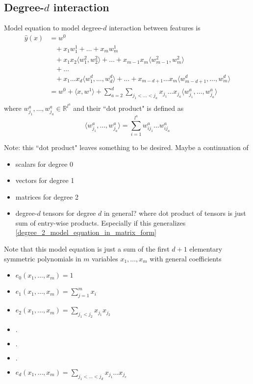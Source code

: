 \documentclass[14pt, reqno]{amsart}
\theoremstyle{definition}
\begin{document}
\vfill
\pagebreak

\subsection{Degree-$d$ interaction} Model equation to model degree-$d$ interaction between features is
\begin{equation}\label{degree_d_model_equation}
\begin{split}
\hat{y}(x) & = w^0 \\
 & \,\,\,\,\, + x_1 w_1^1 + \dots + x_m w_m^1 \\
 & \,\,\,\,\, + x_1 x_2 \langle w_1^2, w_2^2 \rangle + \dots + x_{m-1} x_m \langle w_{m-1}^2, w_m^2 \rangle \\
 & \,\,\,\,\, + \dots \\
 & \,\,\,\,\, + x_1 \dots x_d \langle w_1^d, \dots , w_d^d \rangle + \dots + x_{m-d+1} \dots x_m \langle w_{m-d+1}^d, \dots , w_m^d \rangle \\
 & = w^0 + \langle x, w^1 \rangle + \sum\limits_{a = 2}^d \sum\limits_{j_1 < ... < j_a} x_{j_1} ... x_{j_a} \langle w_{j_1}^a, \dots , w_{j_a}^a \rangle \\
\end{split}
\end{equation}
where $w_{j_1}^a, \dots , w_{j_a}^a \in \mathbb{R}^{l^a}$ and their ``dot product" is defined as
$$\langle w_{j_1}^a, \dots , w_{j_a}^a \rangle = \sum\limits_{i = 1}^{l^a} w_{i j_1}^a \dots w_{i j_a}^a$$

Note: this ``dot product" leaves something to be desired. Maybe a continuation of
\begin{itemize}
\item scalars for degree 0
\item vectors for degree 1
\item matrices for degree 2
\item degree-$d$ tensors for degree $d$ in general? where dot product of tensors is just sum of entry-wise products. Especially if this generalizes \eqref{degree_2_model_equation_in_matrix_form}
\end{itemize}

Note that this model equation is just a sum of the first $d+1$ elementary symmetric polynomials in $m$ variables $x_1, \dots , x_m$ with general coefficients
\begin{itemize}
\item $e_0(x_1, \dots , x_m) = 1$
\item $e_1(x_1, \dots , x_m) = \sum\limits_{j = 1}^m x_i$
\item $e_2(x_1, \dots , x_m) = \sum\limits_{j_1 < j_2} x_{j_1} x_{j_2}$
\item $.$
\item $.$
\item $.$
\item $e_d(x_1, \dots , x_m) = \sum\limits_{j_1 < \dots < j_d} x_{j_1} \dots x_{j_e}$
\end{itemize}
\end{document}
